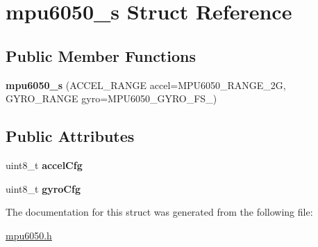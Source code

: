 \hypertarget{structmpu6050__s}{}\section{mpu6050\+\_\+s Struct Reference}
\label{structmpu6050__s}
\subsection*{Public Member Functions}
\begin{DoxyCompactItemize}
\item 
\mbox{\label{structmpu6050__s_ab8ff10bcdf8741b34b5fa0d44d8d444c}} 
{\bfseries mpu6050\+\_\+s} (A\+C\+C\+E\+L\+\_\+\+R\+A\+N\+GE accel=M\+P\+U6050\+\_\+\+R\+A\+N\+G\+E\+\_\+2G, G\+Y\+R\+O\+\_\+\+R\+A\+N\+GE gyro=M\+P\+U6050\+\_\+\+G\+Y\+R\+O\+\_\+\+F\+S\+\_)
\end{DoxyCompactItemize}
\subsection*{Public Attributes}
\begin{DoxyCompactItemize}
\item 
\mbox{\label{structmpu6050__s_ad31e74a1edf8e3a6259925c87fc8043e}} 
uint8\+\_\+t {\bfseries accel\+Cfg}
\item 
\mbox{\label{structmpu6050__s_a2e8ba692a704c815ce6e4c6288b64787}} 
uint8\+\_\+t {\bfseries gyro\+Cfg}
\end{DoxyCompactItemize}


The documentation for this struct was generated from the following file\+:\begin{DoxyCompactItemize}
\item 
\hyperlink{mpu6050_8h}{mpu6050.\+h}\end{DoxyCompactItemize}
